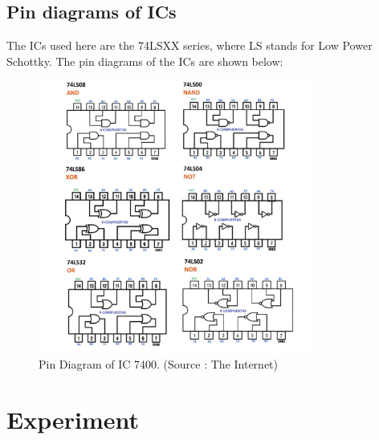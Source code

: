 \documentclass{scrartcl}
\newcommand{\1}{\mathbbm{1}}
\begin{document}
\subsection{Pin diagrams of ICs}
The ICs used here are the 74LSXX series, where LS stands for Low Power Schottky. The pin diagrams of the ICs are shown below:
\begin{figure}[H]
        \centering
        \includegraphics[width=0.8\textwidth]{gates.png}
        \caption{Pin Diagram of IC 7400. (Source : The Internet)}
\end{figure}
\section{Experiment}
\end{document}
